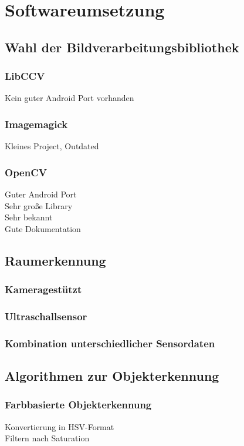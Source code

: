 \chapter{Softwareumsetzung}

\section{Wahl der Bildverarbeitungsbibliothek}
\subsection{LibCCV}
Kein guter Android Port vorhanden
\subsection{Imagemagick}
Kleines Project, Outdated
\subsection{OpenCV}
Guter Android Port\\
Sehr große Library\\
Sehr bekannt\\
Gute Dokumentation\\


\section{Raumerkennung}
\subsection{Kameragestützt}
\subsection{Ultraschallsensor}
\subsection{Kombination unterschiedlicher Sensordaten}

\section{Algorithmen zur Objekterkennung}
\subsection{Farbbasierte Objekterkennung}
Konvertierung in HSV-Format\\
Filtern nach Saturation\\

